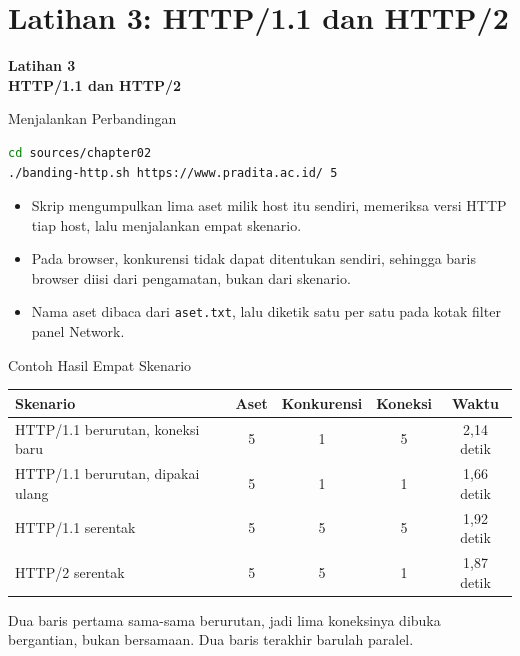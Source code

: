 \documentclass[aspectratio=169, table, 12pt]{beamer}
\begin{document}
\section{Latihan 3: HTTP/1.1 dan HTTP/2}

\begin{frame}{\hfill}
  \centering
  \Huge{\textbf{Latihan 3\\HTTP/1.1 dan HTTP/2}}
\end{frame}

\begin{frame}[fragile]{{\Large Menjalankan Perbandingan}}
  \vspace{3pt}
\begin{lstlisting}[language=bash]
cd sources/chapter02
./banding-http.sh https://www.pradita.ac.id/ 5
\end{lstlisting}

  \vspace{3pt}
  \begin{itemize}
    \item Skrip mengumpulkan lima aset milik host itu sendiri, memeriksa
          versi HTTP tiap host, lalu menjalankan empat skenario.
    \item Pada browser, konkurensi tidak dapat ditentukan sendiri, sehingga
          baris browser diisi dari pengamatan, bukan dari skenario.
    \item Nama aset dibaca dari \texttt{aset.txt}, lalu diketik satu per satu
          pada kotak filter panel Network.
  \end{itemize}
\end{frame}

\begin{frame}{{\Large Contoh Hasil Empat Skenario}}
  \vspace{5pt}
  \centering
  {\small
  \begin{tabularx}{0.97\textwidth}{Xcccc}
    \hline
    \textbf{Skenario} & \textbf{Aset} & \textbf{Konkurensi} & \textbf{Koneksi} & \textbf{Waktu} \\
    \hline
    HTTP/1.1 berurutan, koneksi baru & 5 & 1 & 5 & 2,14 detik \\
    \hline
    HTTP/1.1 berurutan, dipakai ulang & 5 & 1 & 1 & 1,66 detik \\
    \hline
    HTTP/1.1 serentak & 5 & 5 & 5 & 1,92 detik \\
    \hline
    HTTP/2 serentak & 5 & 5 & 1 & 1,87 detik \\
    \hline
  \end{tabularx}}

  \vspace{6pt}
  {\footnotesize Dua baris pertama sama-sama berurutan, jadi lima koneksinya
  dibuka bergantian, bukan bersamaan. Dua baris terakhir barulah paralel.}
\end{frame}
\end{document}
